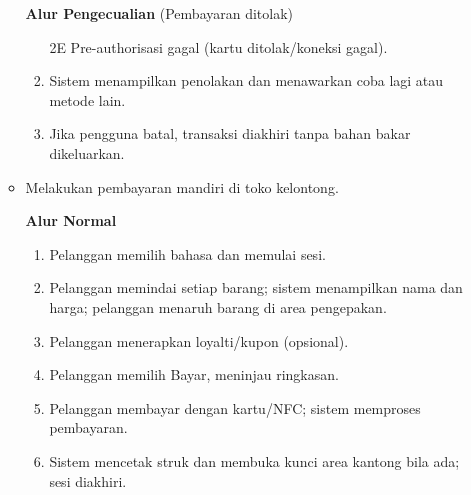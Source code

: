 \documentclass[a4paper]{article}
\begin{document}
\begin{enumerate}[itemsep=1em]
\begin{itemize}[itemsep=1em]
    \vspace{1em}

    \textbf{Alur Pengecualian} (Pembayaran ditolak)
    \begin{enumerate}[nosep]
      \item[2E] Pre-authorisasi gagal (kartu ditolak/koneksi gagal).
      \item Sistem menampilkan penolakan dan menawarkan coba lagi atau metode lain.
      \item Jika pengguna batal, transaksi diakhiri tanpa bahan bakar dikeluarkan.
    \end{enumerate}

    \vspace{1em}


    \item Melakukan pembayaran mandiri di toko kelontong.


    \vspace{1em}

    \textbf{Alur Normal}
    \begin{enumerate}[nosep]
      \item Pelanggan memilih bahasa dan memulai sesi.
      \item Pelanggan memindai setiap barang; sistem menampilkan nama dan harga; pelanggan menaruh barang di area pengepakan.
      \item Pelanggan menerapkan loyalti/kupon (opsional).
      \item Pelanggan memilih Bayar, meninjau ringkasan.
      \item Pelanggan membayar dengan kartu/NFC; sistem memproses pembayaran.
      \item Sistem mencetak struk dan membuka kunci area kantong bila ada; sesi diakhiri.
    \end{enumerate}


\end{itemize}
\end{enumerate}
\end{document}
